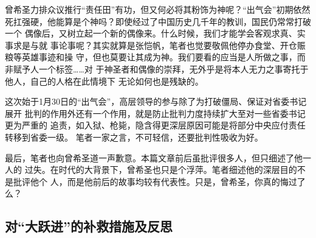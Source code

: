 曾希圣力排众议推行“责任田”有功，但又何必将其粉饰为神呢？“出气会”初期依然
死扛强硬，他能算是个神吗？即使经过了中国历史几千年的教训，国民仍常常打破一个
偶像后，又树立起一个新的偶像来。什么时候，我们才能学会客观求真、实事求是与就
事论事呢？其实就算是张恺帆，笔者也觉要敬佩他停办食堂、开仓赈粮等英雄事迹和操
守，但也莫要让其成为神。我们要看的应当是人所做之事，而非赋予人一个标签……对
于神圣者和偶像的崇拜，无外乎是将本人无力之事寄托于他人，自己的人格在此情境下
无论如何也是残缺的。

这次始于1月30日的“出气会”，高层领导的参与除了为打破僵局、保证对省委书记展开
批判的作用外还有一个作用，就是防止批判力度持续扩大至对一些省委书记更为严重的
追责，如入狱、枪毙，隐含得更深层原因可能是将部分中央应付责任转移到省委一级。
笔者一家之言，不可轻信，还要批判性吸收为好。


最后，笔者也向曾希圣道一声歉意。本篇文章前后虽批评很多人，但只细述了他一人的
过失。在时代的大背景下，曾希圣也只是个浮萍。笔者细述他的深层目的不是批评他个
人，而是他前后的故事均较有代表性。只是，曾希圣，你真的悔过了么？

\subsection{对“大跃进”的补救措施及反思}

